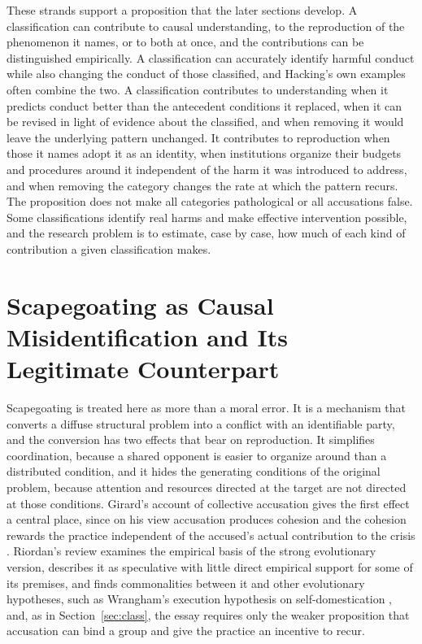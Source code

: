 \documentclass[12pt]{article}
\theoremstyle{remark}
\begin{document}
These strands support a proposition that the later sections develop. A classification can contribute to causal understanding, to the reproduction of the phenomenon it names, or to both at once, and the contributions can be distinguished empirically. A classification can accurately identify harmful conduct while also changing the conduct of those classified, and Hacking's own examples often combine the two. A classification contributes to understanding when it predicts conduct better than the antecedent conditions it replaced, when it can be revised in light of evidence about the classified, and when removing it would leave the underlying pattern unchanged. It contributes to reproduction when those it names adopt it as an identity, when institutions organize their budgets and procedures around it independent of the harm it was introduced to address, and when removing the category changes the rate at which the pattern recurs. The proposition does not make all categories pathological or all accusations false. Some classifications identify real harms and make effective intervention possible, and the research problem is to estimate, case by case, how much of each kind of contribution a given classification makes.

\section{Scapegoating as Causal Misidentification and Its Legitimate Counterpart}
\label{sec:scapegoat}

Scapegoating is treated here as more than a moral error. It is a mechanism that converts a diffuse structural problem into a conflict with an identifiable party, and the conversion has two effects that bear on reproduction. It simplifies coordination, because a shared opponent is easier to organize around than a distributed condition, and it hides the generating conditions of the original problem, because attention and resources directed at the target are not directed at those conditions. Girard's account of collective accusation gives the first effect a central place, since on his view accusation produces cohesion and the cohesion rewards the practice independent of the accused's actual contribution to the crisis \cite{girard1977,girard1986}. Riordan's review examines the empirical basis of the strong evolutionary version, describes it as speculative with little direct empirical support for some of its premises, and finds commonalities between it and other evolutionary hypotheses, such as Wrangham's execution hypothesis on self-domestication \cite{riordan2021}, and, as in Section~\ref{sec:class}, the essay requires only the weaker proposition that accusation can bind a group and give the practice an incentive to recur.
\end{document}
